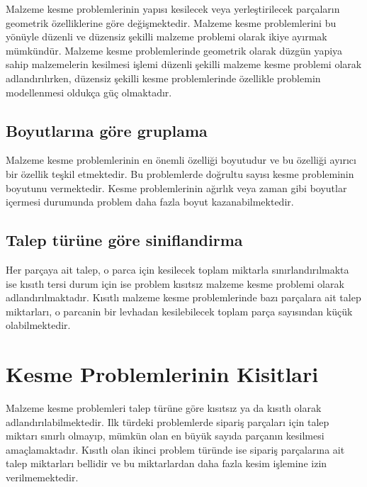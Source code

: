 \documentclass[]{book}
\begin{document}
Malzeme kesme problemlerinin yapısı kesilecek veya yerleştirilecek parçaların geometrik özelliklerine göre değişmektedir. Malzeme kesme problemlerini bu yönüyle düzenli ve düzensiz şekilli malzeme problemi olarak ikiye ayırmak mümkündür. Malzeme kesme problemlerinde geometrik olarak düzgün yapiya sahip malzemelerin kesilmesi işlemi düzenli şekilli malzeme kesme problemi olarak adlandırılırken, düzensiz şekilli kesme problemlerinde özellikle problemin modellenmesi oldukça güç olmaktadır.

\hypertarget{boyutlarina-gore-gruplama}{%
\subsection{Boyutlarına göre gruplama}\label{boyutlarina-gore-gruplama}}

Malzeme kesme problemlerinin en önemli özelliği boyutudur ve bu özelliği ayırıcı bir özellik teşkil etmektedir. Bu problemlerde doğrultu sayısı kesme probleminin boyutunu vermektedir. Kesme problemlerinin ağırlık veya zaman gibi boyutlar içermesi durumunda problem daha fazla boyut kazanabilmektedir.

\hypertarget{talep-turune-gore-siniflandirma}{%
\subsection{Talep türüne göre siniflandirma}\label{talep-turune-gore-siniflandirma}}

Her parçaya ait talep, o parca için kesilecek toplam miktarla sınırlandırılmakta ise kısıtlı tersi durum için ise problem kısıtsız malzeme kesme problemi olarak adlandırılmaktadır. Kısıtlı malzeme kesme problemlerinde bazı parçalara ait talep miktarları, o parcanin bir levhadan kesilebilecek toplam parça sayısından küçük olabilmektedir.

\hypertarget{kesme-problemlerinin-kisitlari}{%
\section{Kesme Problemlerinin Kisitlari}\label{kesme-problemlerinin-kisitlari}}

Malzeme kesme problemleri talep türüne göre kısıtsız ya da kısıtlı olarak adlandırılabilmektedir. Ilk türdeki problemlerde sipariş parçaları için talep miktarı sınırlı olmayıp, mümkün olan en büyük sayıda parçanın kesilmesi amaçlamaktadır.
Kısıtlı olan ikinci problem türünde ise sipariş parçalarına ait talep miktarları bellidir ve bu miktarlardan daha fazla kesim işlemine izin verilmemektedir.
\end{document}
